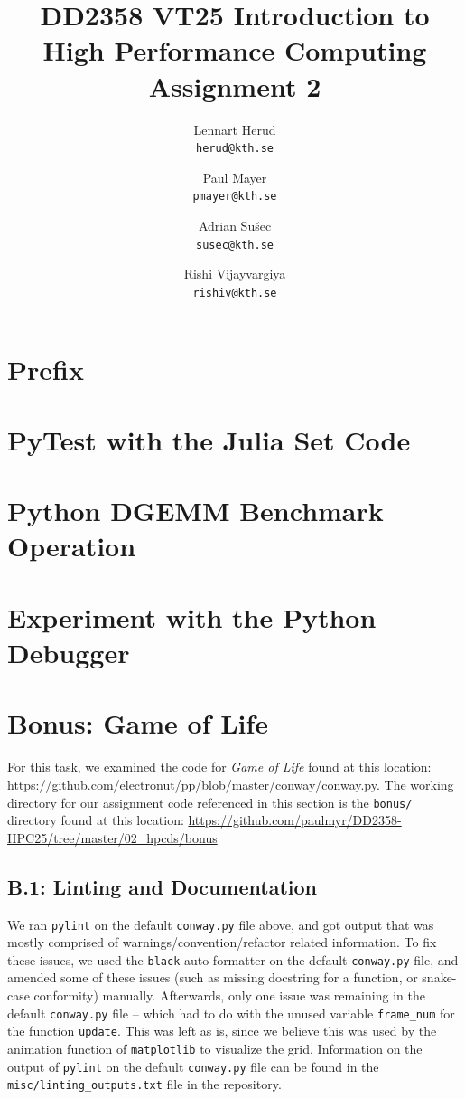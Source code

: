 \documentclass[a4paper,12pt]{article}
\title{
  \normalsize{DD2358 VT25 Introduction to}\\
  \normalsize{High Performance Computing}\\
  \large{Assignment 2}\\
}
\author{
  \small Lennart Herud\\[-0.75ex]
  \scriptsize\texttt{herud@kth.se}
  \and
    \small Paul Mayer\\[-0.75ex]
  \scriptsize\texttt{pmayer@kth.se}
  \and
    \small Adrian Sušec\\[-0.75ex]
  \scriptsize\texttt{susec@kth.se}
  \and
  \small Rishi Vijayvargiya\\[-0.75ex]
  \scriptsize\texttt{rishiv@kth.se}
}
\date{}
\begin{document}
\maketitle
\thispagestyle{firstpagestyle}

\listoftodos

\vspace{1em}

%
\section*{Prefix}

%

\section{PyTest with the Julia Set Code}
\section{Python DGEMM Benchmark Operation}
\section{Experiment with the Python Debugger}
\section{Bonus: Game of Life}
For this task, we examined the code for \textit{Game of Life} found at this location: \url{https://github.com/electronut/pp/blob/master/conway/conway.py}. The working directory for our assignment code referenced in this section is the \verb|bonus/| directory found at this location: \url{https://github.com/paulmyr/DD2358-HPC25/tree/master/02_hpcds/bonus}
\subsection{B.1: Linting and Documentation}
We ran \verb|pylint| on the default \verb|conway.py| file above, and got output that was mostly comprised of warnings/convention/refactor related information. To fix these issues, we used the \verb|black| auto-formatter on the default \verb|conway.py| file, and amended some of these issues (such as missing docstring for a function, or snake-case conformity) manually. Afterwards, only one issue was remaining in the default \verb|conway.py| file -- which had to do with the unused variable \verb|frame_num| for the function \verb|update|. This was left as is, since we believe this was used by the animation function of \verb|matplotlib| to visualize the grid. Information on the output of \verb|pylint| on the default \verb|conway.py| file can be found in the \verb|misc/linting_outputs.txt| file in the repository. 
\end{document}
